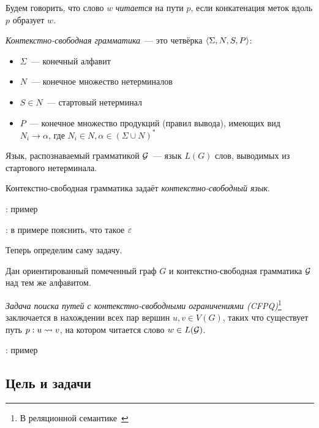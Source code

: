 \begin{definition}
  Будем говорить, что слово $w$ \textit{читается} на пути $p$, если конкатенация меток вдоль $p$ образует $w$. 
\end{definition}

\begin{definition}
  \textit{Контекстно-свободная грамматика}~--- это четвёрка $\langle \Sigma, N, S, P \rangle$:
  \vspace{-\topsep}
  \begin{itemize}
    \setlength\itemsep{-0.1em}
    \item $\Sigma$~--- конечный алфавит
    \item $N$~--- конечное множество нетерминалов
    \item $S \in N$~--- стартовый нетерминал
    \item $P$~--- конечное множество продукций (правил вывода), имеющих вид\\ $N_i \to \alpha$, где $N_i \in N, \alpha \in (\Sigma \cup N)^{*}$
  \end{itemize}

  Язык, распознаваемый грамматикой $\mathcal{G}$~--- язык $L(G)$ слов, выводимых из стартового нетерминала.

  Контекстно-свободная грамматика задаёт \textit{контекстно-свободный язык}.
\end{definition}

\TODO: пример

\TODO: в примере пояснить, что такое $\varepsilon$

Теперь определим саму задачу.

\begin{definition}
  Дан ориентированный помеченный граф $G$ и контекстно-свободная грамматика $\mathcal{G}$ над тем же алфавитом.

  \textit{Задача поиска путей с контекстно-свободными ограничениями (CFPQ)}\footnote{В реляционной семантике~\cite{Hellings16}} заключается в нахождении всех пар вершин $u, v \in V(G)$, таких что существует путь $p: u \rightsquigarrow v$, на котором читается слово $w \in L(\mathcal{G})$.

\end{definition}

\TODO: пример


\subsection*{Цель и задачи}

